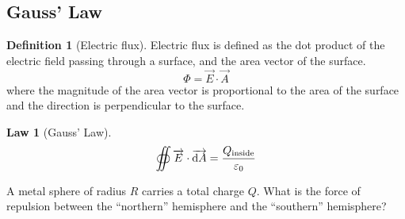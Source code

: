 \documentclass[fleqn, a4paper, 8pt, twoside]{amsart}
\theoremstyle{definition}
\newtheorem{definition}{Definition}
\theoremstyle{theorem}
\newtheorem{law}{Law}
\begin{document}
\begin{multicols}{2}
\begin{spacing}{0.6}
\section{Gauss' Law}

\begin{definition}[Electric flux]
	Electric flux is defined as the dot product of the electric field passing through a surface, and the area vector of the surface.
	\begin{equation*}
		\Phi = \overrightarrow{E} \cdot \overrightarrow{A}
	\end{equation*}
	where the magnitude of the area vector is proportional to the area of the surface and the direction is perpendicular to the surface.
\end{definition}

\begin{law}[Gauss' Law]
	\begin{equation*}
		\oiint \overrightarrow{E} \cdot \overrightarrow{\dif A} = \frac{Q_{\textnormal{inside}}}{\varepsilon_0}
	\end{equation*}
	\label{Gauss'_Law}
\end{law}

\begin{question}
	A metal sphere of radius $R$ carries a total charge $Q$.
	What is the force of repulsion between the ``northern'' hemisphere and the ``southern'' hemisphere?
\end{question}


\end{spacing}
\end{multicols}
\end{document}
